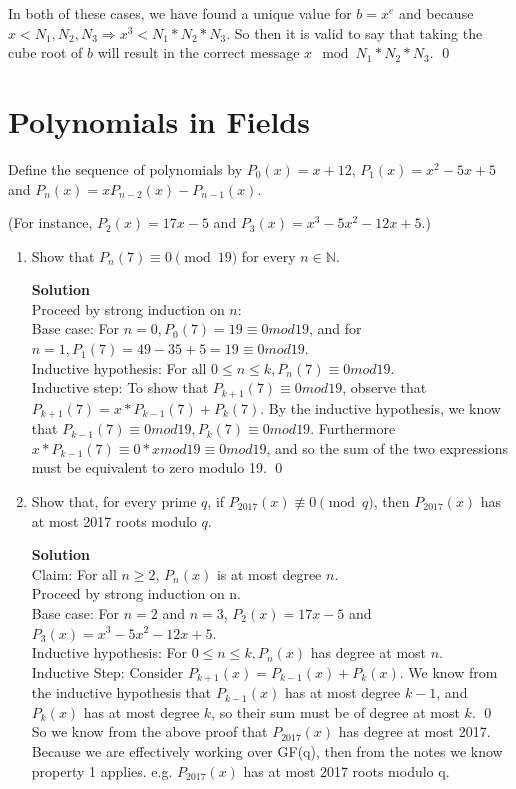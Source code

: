 \documentclass[11pt]{article}
\newcommand*{\Question}[1]{\section{#1}}
\newenvironment{Parts}{\begin{enumerate}[label=(\alph*)]}{\end{enumerate}}
\newcommand*{\Part}{\item}
\newcommand*{\N}{\mathbb{N}}
\begin{document}
\begin{Parts}
\begin{mdframed}
In both of these cases, we have found a unique value for $b=x^e$ and because $x<N_1,N_2,N_3 \Rightarrow x^3<N_1*N_2*N_3$. So then it is valid to say that taking the cube root of $b$ will result in the correct message $x \mod N_1*N_2*N_3$. \qed
\end{mdframed}

\end{Parts}





\Question{Polynomials in Fields}
 Define the sequence of polynomials by $P_0(x) = x+12$, $P_1(x) = x^2 - 5x + 5$ and $P_n(x) = x P_{n-2}(x) - P_{n-1}(x)$.
  
  (For instance, $P_2(x) = 17x-5$ and $P_3(x) = x^3 - 5x^2 - 12x + 5$.)
  \begin{Parts}
  \Part Show that $P_n(7) \equiv 0 \pmod{19}$ for every $n\in \N$.
\begin{mdframed} \textbf{Solution} \\
Proceed by strong induction on $n$: \\
Base case: For $n=0, P_0(7)=19 \equiv 0mod19$, and for $n=1, P_1(7)=49-35+5=19 \equiv 0mod19$. \\
Inductive hypothesis: For all $0 \leq n \leq k, P_n(7) \equiv 0mod19$. \\
Inductive step: To show that $P_{k+1}(7) \equiv 0mod19$, observe that $P_{k+1}(7)=x*P_{k-1}(7)+P_k(7)$. By the inductive hypothesis, we know that $P_{k-1}(7) \equiv 0mod19, P_k(7) \equiv 0mod19$. Furthermore $x*P_{k-1}(7) \equiv 0*xmod19 \equiv 0mod19$, and so the sum of the two expressions must be equivalent to zero modulo 19. \qed
\end{mdframed}
  
  \Part Show that, for every prime $q$, if $P_{2017}(x) \not\equiv 0 \pmod{q}$, then $P_{2017}(x)$ has at most 2017 roots modulo $q$.\\
\begin{mdframed} \textbf{Solution} \\
Claim: For all $n \geq 2$, $P_n(x)$ is at most degree $n$. \\
Proceed by strong induction on n. \\
Base case: For $n=2$ and $n=3$, $P_2(x)=17x-5$ and $P_3(x)=x^3-5x^2-12x+5$. \\
Inductive hypothesis: For $0 \leq n \leq k, P_n(x)$ has degree at most $n$. \\
Inductive Step: Consider $P_{k+1}(x)=P_{k-1}(x)+P_{k}(x)$. We know from the inductive hypothesis that $P_{k-1}(x)$ has at most degree $k-1$, and $P_k(x)$ has at most degree $k$, so their sum must be of degree at most $k$. \qed \\
So we know from the above proof that $P_{2017}(x)$ has degree at most 2017. Because we are effectively working over GF(q), then from the notes we know property 1 applies. e.g. $P_{2017}(x)$ has at most 2017 roots modulo q. 


\end{mdframed}
\end{Parts}
\end{document}
